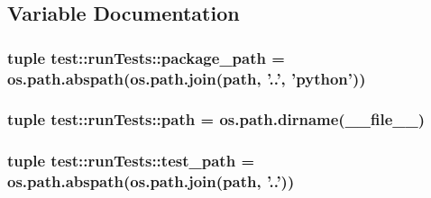 \subsection{\-Variable \-Documentation}
\hypertarget{namespacetest_1_1runTests_a2af511a0550427b87fbe51628ba30779}{
\subsubsection[{package\-\_\-path}]{\setlength{\rightskip}{0pt plus 5cm}tuple {\bf test\-::run\-Tests\-::package\-\_\-path} = os.\-path.\-abspath(os.\-path.\-join({\bf path}, '..', 'python'))}}\label{d1/d2b/namespacetest_1_1runTests_a2af511a0550427b87fbe51628ba30779}
\hypertarget{namespacetest_1_1runTests_afa3e11c0c61a27c8c663d851f380d8c5}{
\subsubsection[{path}]{\setlength{\rightskip}{0pt plus 5cm}tuple {\bf test\-::run\-Tests\-::path} = os.\-path.\-dirname(\-\_\-\-\_\-file\-\_\-\-\_\-)}}\label{d1/d2b/namespacetest_1_1runTests_afa3e11c0c61a27c8c663d851f380d8c5}
\hypertarget{namespacetest_1_1runTests_a1e0d9e48d59a05e7ff157f932bcf0112}{
\subsubsection[{test\-\_\-path}]{\setlength{\rightskip}{0pt plus 5cm}tuple {\bf test\-::run\-Tests\-::test\-\_\-path} = os.\-path.\-abspath(os.\-path.\-join({\bf path}, '..'))}}\label{d1/d2b/namespacetest_1_1runTests_a1e0d9e48d59a05e7ff157f932bcf0112}
